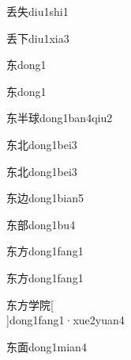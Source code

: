 \begin{verbete}[6;5]{丢失}{diu1shi1}
\end{verbete}

\begin{verbete}[6;3]{丢下}{diu1xia3}
\end{verbete}

\begin{verbete}[5]{东}{dong1}
\end{verbete}
\begin{verbete*}[5]{东}{dong1}
\end{verbete*}

\begin{verbete*}[5;5;11]{东半球}{dong1ban4qiu2}
\end{verbete*}

\begin{verbete}[5;5]{东北}{dong1bei3}
\end{verbete}
\begin{verbete*}[5;5]{东北}{dong1bei3}
\end{verbete*}

\begin{verbete}[5;5]{东边}{dong1bian5}
\end{verbete}

\begin{verbete}[5;10]{东部}{dong1bu4}
\end{verbete}

\begin{verbete}[5;4]{东方}{dong1fang1}
\end{verbete}
\begin{verbete*}[5;4]{东方}{dong1fang1}
\end{verbete*}

\begin{verbete*}[5;4;8;9]{东方学院}[\\]{dong1fang1·xue2yuan4}
\end{verbete*}

\begin{verbete}[5;9]{东面}{dong1mian4}
\end{verbete}

